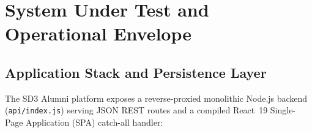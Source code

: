 \documentclass[11pt,letterpaper]{article}
\begin{document}
\clearpage
\tableofcontents
\clearpage

\section{System Under Test and Operational Envelope}

\subsection{Application Stack and Persistence Layer}
The SD3 Alumni platform exposes a reverse-proxied monolithic Node.js backend (\texttt{api/index.js}) serving JSON REST routes and a compiled React~19 Single-Page Application (SPA) catch-all handler:
\end{document}

